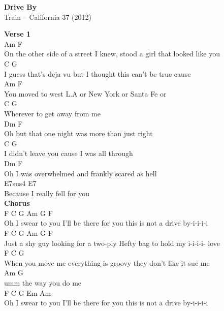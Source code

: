 \documentclass[a4paper]{article}
\begin{document}
    \begin{center}
        \textbf{Drive By}
        ~\\
        Train -- California 37 (2012)
    \end{center}
    {
        \scriptsize
        \textbf{Verse 1}
        ~\\
        {
            \cutive
            \obeyspaces
Am                                   F
\\
On the other side of a street I knew, stood a girl that looked like you 
\\
C                         G
\\
I guess that's deja vu but I thought this can't be true cause 
\\
Am                       F
\\
You moved to west L.A or New York or Santa Fe or 
\\
C                         G
\\
Wherever to get away from me
\\
Dm                    F
\\
Oh but that one night was more than just right
\\
C                  G
\\
I didn't leave you cause I was all through 
\\
Dm                   F
\\
Oh I was overwhelmed and frankly scared as hell 
\\
E7sus4           E7
\\
Because I really fell for you
\\

        }
        \textbf{Chorus}
        ~\\
        {
            \cutive
            \obeyspaces
F                 C                     G                   Am   G   F
\\
Oh I swear to you I'll be there for you this is not a drive by-i-i-i-i
\\
F              C                     G                    Am  G      F
\\
Just a shy guy looking for a two-ply Hefty bag to hold my i-i-i-i- love 
\\
F                C                    G
\\
When you move me everything is groovy they don't like it sue me 
\\
Am              G
\\
umm the way you do me 
\\
F                 C                     G                   Em       Am
\\
Oh I swear to you I'll be there for you this is not a drive by-i-i-i-i
\\

}}
\end{document}
